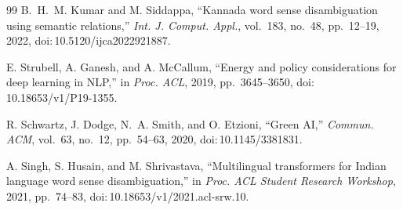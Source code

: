 \documentclass{ieeeaccess}
\begin{document}
\begin{thebibliography}{99}
B.~H.~M. Kumar and M. Siddappa, ``Kannada word sense disambiguation using
semantic relations,'' \emph{Int. J. Comput. Appl.}, vol.~183, no.~48,
pp.~12--19, 2022, doi:\,10.5120/ijca2022921887.

E. Strubell, A. Ganesh, and A. McCallum, ``Energy and policy considerations
for deep learning in NLP,'' in \emph{Proc. ACL}, 2019, pp.~3645--3650,
doi:\,10.18653/v1/P19-1355.

R. Schwartz, J. Dodge, N.~A. Smith, and O. Etzioni, ``Green AI,''
\emph{Commun. ACM}, vol.~63, no.~12, pp.~54--63, 2020,
doi:\,10.1145/3381831.

A. Singh, S. Husain, and M. Shrivastava, ``Multilingual transformers for
Indian language word sense disambiguation,'' in
\emph{Proc. ACL Student Research Workshop}, 2021, pp.~74--83,
doi:\,10.18653/v1/2021.acl-srw.10.

\end{thebibliography}

\EOD
\end{document}
